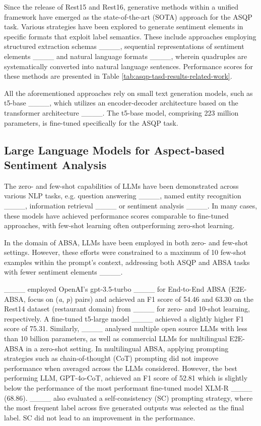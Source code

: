 Since the release of Rest15 and Rest16, generative methods within a unified framework have emerged as the state-of-the-art (SOTA) approach for the ASQP task. Various strategies have been explored to generate sentiment elements in specific formats that exploit label semantics. These include approaches employing structured extraction schemas ____, sequential representations of sentiment elements ____ and natural language formats ____, wherein quadruples are systematically converted into natural language sentences. Performance scores for these methods are presented in Table \ref{tab:asqp-tasd-results-related-work}.

All the aforementioned approaches rely on small text generation models, such as t5-base ____, which utilizes an encoder-decoder architecture based on the transformer architecture ____. The t5-base model, comprising 223 million parameters, is fine-tuned specifically for the ASQP task.

\subsection{Large Language Models for Aspect-based Sentiment Analysis}

The zero- and few-shot capabilities of LLMs have been demonstrated across various NLP tasks, e.g. question answering ____, named entity recognition ____, information retrieval ____ or sentiment analysis ____. In many cases, these models have achieved performance scores comparable to fine-tuned approaches, with few-shot learning often outperforming zero-shot learning.

In the domain of ABSA, LLMs have been employed in both zero- and few-shot settings. However, these efforts were constrained to a maximum of 10 few-shot examples within the prompt's context, addressing both ASQP and ABSA tasks with fewer sentiment elements ____.


____ employed OpenAI's gpt-3.5-turbo ____ for End-to-End ABSA (E2E-ABSA, focus on (\textit{a}, \textit{p}) pairs) and achieved an F1 score of 54.46 and 63.30 on the Rest14 dataset (restaurant domain) from ____ for zero- and 10-shot learning, respectively. A fine-tuned t5-large model ____ achieved a slightly higher F1 score of 75.31. Similarly, ____ analysed multiple open source LLMs with less than 10 billion parameters, as well as commercial LLMs for multilingual E2E-ABSA in a zero-shot setting. In multilingual ABSA, applying prompting strategies such as chain-of-thought (CoT) prompting did not improve performance when averaged across the LLMs considered. However, the best performing LLM, GPT-4o-CoT, achieved an F1 score of 52.81 which is slightly below the performance of the most performant fine-tuned model XLM-R ____ (68.86). ____ also evaluated a self-consistency (SC) prompting strategy, where the most frequent label across five generated outputs was selected as the final label. SC did not lead to an improvement in the performance.

